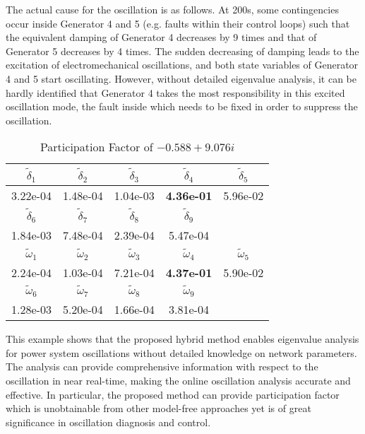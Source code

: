 \documentclass[journal]{IEEEtran}
\begin{document}
The actual cause for the oscillation is as follows. At 200s, some contingencies occur inside Generator 4 and 5 (e.g. faults within their control loops) such that the equivalent damping of Generator 4 decreases by 9 times and that of Generator 5 decreases by 4 times. The sudden decreasing of damping leads to the excitation of electromechanical oscillations, and both state variables of Generator 4 and 5 start oscillating. However, without detailed eigenvalue analysis, it can be hardly identified that Generator 4 takes the most responsibility in this excited oscillation mode, the fault inside which needs to be fixed in order to suppress the oscillation. \begin{table}[!ht]
\centering
\caption{Participation Factor of $-0.588+9.076i$}\label{39-oscillationPF}
\begin{tabular}{|c|c|c|c|c|}
\hline
$\tilde{\delta}_1$& $\tilde{\delta}_2$&$\tilde{\delta}_3$&$\tilde{\delta}_4$&$\tilde{\delta}_5$\\
\hline
3.22e-04&1.48e-04&1.04e-03&\textbf{4.36e-01}&5.96e-02\\
\hline
$\tilde{\delta}_6$& $\tilde{\delta}_7$&$\tilde{\delta}_8$&$\tilde{\delta}_9$&\\
\hline
{1.84e-03}&{7.48e-04}&{2.39e-04}&{5.47e-04}&\\
\hline
$\tilde{\omega}_1$&$\tilde{\omega}_2$& $\tilde{\omega}_3$&$\tilde{\omega}_4$&$\tilde{\omega}_5$\\
\hline
{2.24e-04}&{1.03e-04}&{7.21e-04}&\textbf{{4.37e-01}}&{5.90e-02}\\
\hline
$\tilde{\omega}_6$&$\tilde{\omega}_7$& $\tilde{\omega}_8$&$\tilde{\omega}_9$&\\
\hline
{1.28e-03}&{5.20e-04}&{1.66e-04}&{3.81e-04}&\\
\hline
\end{tabular}
\end{table}

This example shows that the proposed hybrid method enables eigenvalue analysis for power system oscillations without detailed knowledge on network parameters. The analysis can provide comprehensive information with respect to the oscillation in near real-time, making the online oscillation analysis accurate and effective. In particular, the proposed method can provide participation factor which is unobtainable from other model-free approaches yet is of great significance in oscillation diagnosis and control.
\end{document}
